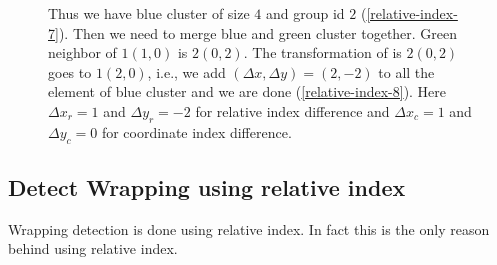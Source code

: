 \begin{figure}
	\centering
	\caption{ Thus we have blue cluster of size $4$ and group id $2$ (\ref{relative-index-7}).  Then we need to merge blue and green cluster together. Green neighbor of $1(1,0)$ is $2(0,2)$. The transformation of is $2(0,2)$ goes to $1(2,0)$, i.e., we add $(\Delta x, \Delta y)=(2,-2)$ to all the element of blue cluster and we are done (\ref{relative-index-8}). Here $\Delta x_r=1$ and $\Delta y_r=-2$ for relative index difference and $\Delta x_c=1$ and $\Delta y_c=0$ for coordinate index difference.}
	\label{fig:relative-index-3}
\end{figure}

\subsection{Detect Wrapping using relative index}
Wrapping detection is done using relative index. In fact this is the only reason behind using relative index.

